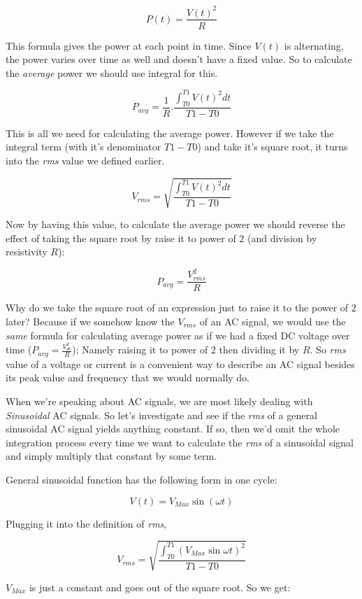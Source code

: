 \documentclass{article}
\begin{document}
	$$P(t) = \frac{V(t)^2}{R}$$
	
	This formula gives the power at each point in time. Since $V(t)$ is alternating, the power varies over time as well and doesn't have a fixed value. So to calculate the \textit{average} power we should use integral for this.
	
	$$P_{avg} = \frac{1}{R}.\frac{\int_{T0}^{T1} V(t)^2 dt }{T1 - T0}$$
	
	This is all we need for calculating the average power. However if we take the integral term (with it's denominator $T1 - T0$) and take it's square root, it turns into the \textit{rms} value we defined earlier.
	
	$$V_{rms} = \sqrt{\frac{\int_{T0}^{T1} V(t)^2 dt }{T1 - T0}} $$
	
	Now by having this value, to calculate the average power we should reverse the effect of taking the square root by raise it to power of $2$ (and division by resistivity $R$):
	
	$$ P_{avg} = \frac{V^2_{rms}}{R} $$
	
	Why do we take the square root of an expression just to raise it to the power of $2$ later? Because if we somehow know the $V_{rms}$ of an AC signal, we would use the \textit{same} formula for calculating average power as if we had a fixed DC voltage over time ($P_{avg} = \frac{V^2_{dc}}{R}$); Namely raising it to power of $2$ then dividing it by $R$. So \textit{rms} value of a voltage or current is a convenient way to describe an AC signal besides its peak value and frequency that we would normally do.
	
	When we're speaking about AC signals, we are most likely dealing with \textit{Sinusoidal} AC signals. So let's investigate and see if the \textit{rms} of a general sinusoidal AC signal yields anything constant. If so, then we'd omit the whole integration process every time we want to calculate the \textit{rms} of a sinusoidal signal and simply multiply that constant by some term. \textsl{}
	
	General sinusoidal function has the following form in one cycle:
	
	$$ V(t) = V_{Max} \sin(\omega t) $$
	
	Plugging it into the definition of \textit{rms},
	
	$$V_{rms} = \sqrt{\frac{\int_{T0}^{T1} (V_{Max} \sin \omega t) ^ 2}{T1 - T0}}$$
	
	$V_{Max}$ is just a constant and goes out of the square root. So we get:
	
\end{document}
